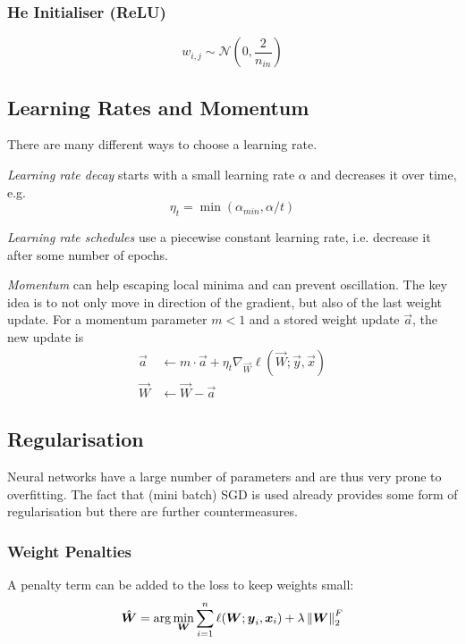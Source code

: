 \subsubsection{He Initialiser (ReLU)}
\begin{equation*}
    w_{i,j} \sim \mathcal{N}\left(0, \frac{2}{n_{in}}\right)
\end{equation*}


\subsection{Learning Rates and Momentum}
There are many different ways to choose a learning rate.

\emph{Learning rate decay} starts with a small
learning rate $\alpha$ and decreases it over time,
e.g.
\begin{equation*}
    \eta_t = \min(\alpha_{min}, \alpha / t)
\end{equation*}

\emph{Learning rate schedules} use a piecewise constant
learning rate, i.e. decrease it after some number of epochs.

\emph{Momentum} can help escaping local minima and
can prevent oscillation.
The key idea is to not only move in direction of the gradient,
but also of the last weight update.
For a momentum parameter $m < 1$ and a stored weight update
$\vec{a}$, the new update is
\begin{align*}
    \vec{a} &\gets m \cdot \vec{a} + \eta_t \nabla_{\vec{W}} \ell(\vec{W}; \vec{y}, \vec{x}) \\
    \vec{W} &\gets \vec{W} - \vec{a}
\end{align*}


\subsection{Regularisation}
Neural networks have a large number of parameters and are thus
very prone to overfitting.
The fact that (mini batch) SGD is used already provides some
form of regularisation but there are further countermeasures.

\subsubsection{Weight Penalties}
A penalty term can be added to the loss to keep weights small:
\begin{equation*}
    \hat{\boldsymbol{W}} = \arg\min_{\boldsymbol{W}}{
        \sum_{i=1}^n{\ell(\boldsymbol{W}; \boldsymbol{y}_i, \boldsymbol{x}_i)}
        + \lambda \left\lVert\boldsymbol{W}\right\rVert_2^F
    }
\end{equation*}

